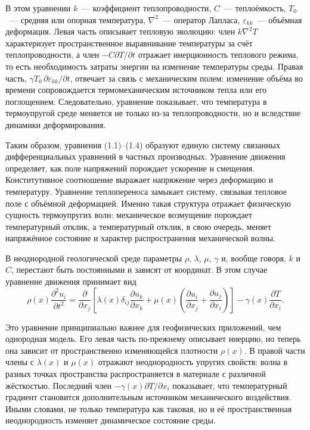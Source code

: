 В этом уравнении $k$~--- коэффициент теплопроводности, $C$~--- теплоёмкость, $T_0$~--- средняя или опорная температура, $\nabla^2$~--- оператор Лапласа, $\varepsilon_{kk}$~--- объёмная деформация. Левая часть описывает тепловую эволюцию: член $k\nabla^2T$ характеризует пространственное выравнивание температуры за счёт теплопроводности, а член $-C\partial T/\partial t$ отражает инерционность теплового режима, то есть необходимость затраты энергии на изменение температуры среды. Правая часть, $\gamma T_0 \, \partial \varepsilon_{kk}/\partial t$, отвечает за связь с механическим полем: изменение объёма во времени сопровождается термомеханическим источником тепла или его поглощением. Следовательно, уравнение показывает, что температура в термоупругой среде меняется не только из-за теплопроводности, но и вследствие динамики деформирования.

Таким образом, уравнения (1.1)--(1.4) образуют единую систему связанных дифференциальных уравнений в частных производных. Уравнение движения определяет, как поле напряжений порождает ускорение и смещения. Конститутивное соотношение выражает напряжение через деформацию и температуру. Уравнение теплопереноса замыкает систему, связывая тепловое поле с объёмной деформацией. Именно такая структура отражает физическую сущность термоупругих волн: механическое возмущение порождает температурный отклик, а температурный отклик, в свою очередь, меняет напряжённое состояние и характер распространения механической волны.

В неоднородной геологической среде параметры $\rho$, $\lambda$, $\mu$, $\gamma$ и, вообще говоря, $k$ и $C$, перестают быть постоянными и зависят от координат. В этом случае уравнение движения принимает вид
\begin{equation}
\rho(x)\frac{\partial^2 u_i}{\partial t^2}
=
\frac{\partial}{\partial x_j}
\left[
\lambda(x)\delta_{ij}\frac{\partial u_k}{\partial x_k}
+
\mu(x)\left(\frac{\partial u_i}{\partial x_j}+\frac{\partial u_j}{\partial x_i}\right)
\right]
-
\gamma(x)\frac{\partial T}{\partial x_i}.
\end{equation}

Это уравнение принципиально важнее для геофизических приложений, чем однородная модель. Его левая часть по-прежнему описывает инерцию, но теперь она зависит от пространственно изменяющейся плотности $\rho(x)$. В правой части члены с $\lambda(x)$ и $\mu(x)$ отражают неоднородность упругих свойств: волна в разных точках пространства распространяется в материале с различной жёсткостью. Последний член $-\gamma(x)\partial T/\partial x_i$ показывает, что температурный градиент становится дополнительным источником механического воздействия. Иными словами, не только температура как таковая, но и её пространственная неоднородность изменяет динамическое состояние среды.

